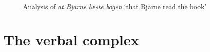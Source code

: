 \begin{enumerate}
\begin{figure}
\caption{\label{fig-at-bjarne-laeste-bogen}Analysis of \emph{at Bjarne læste bogen} `that Bjarne
  read the book'}
\end{figure}



\end{enumerate}

\clearpage

\section{The verbal complex}

